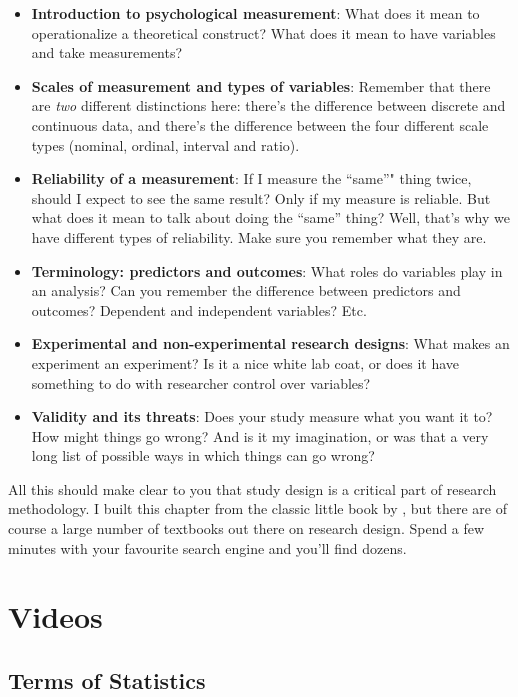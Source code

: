 \documentclass[]{book}
\begin{document}
\begin{itemize}
\item
  \textbf{Introduction to psychological measurement}: What does it mean to operationalize a theoretical construct? What does it mean to have variables and take measurements?
\item
  \textbf{Scales of measurement and types of variables}: Remember that there are \emph{two} different distinctions here: there's the difference between discrete and continuous data, and there's the difference between the four different scale types (nominal, ordinal, interval and ratio).
\item
  \textbf{Reliability of a measurement}: If I measure the ``same''" thing twice, should I expect to see the same result? Only if my measure is reliable. But what does it mean to talk about doing the ``same'' thing? Well, that's why we have different types of reliability. Make sure you remember what they are.
\item
  \textbf{Terminology: predictors and outcomes}: What roles do variables play in an analysis? Can you remember the difference between predictors and outcomes? Dependent and independent variables? Etc.
\item
  \textbf{Experimental and non-experimental research designs}: What makes an experiment an experiment? Is it a nice white lab coat, or does it have something to do with researcher control over variables?
\item
  \textbf{Validity and its threats}: Does your study measure what you want it to? How might things go wrong? And is it my imagination, or was that a very long list of possible ways in which things can go wrong?
\end{itemize}

All this should make clear to you that study design is a critical part of research methodology. I built this chapter from the classic little book by \citet{Campbell1963}, but there are of course a large number of textbooks out there on research design. Spend a few minutes with your favourite search engine and you'll find dozens.

\hypertarget{videos}{%
\section{Videos}\label{videos}}

\hypertarget{terms-of-statistics}{%
\subsection{Terms of Statistics}\label{terms-of-statistics}}
\end{document}
